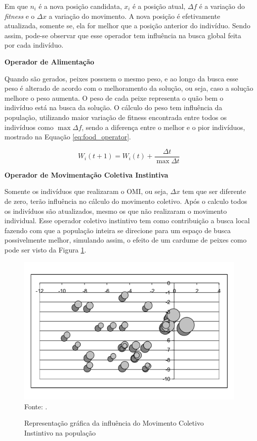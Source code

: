 \noindent Em que $n_i$ é a nova posição candidata, $x_i$ é a posição atual, $\Delta f$ é a variação do \textit{fitness} e o $\Delta x$ a variação do movimento. A nova posição é efetivamente atualizada, somente se, ela for melhor que a posição anterior do indivíduo. Sendo assim, pode-se observar que esse operador tem influência na busca global feita por cada indivíduo.

\noindent \textbf{Operador de Alimentação}

Quando são gerados, peixes possuem o mesmo peso, e ao longo da busca esse peso é alterado de acordo com o melhoramento da solução, ou seja, caso a solução melhore o peso aumenta. O peso de cada peixe representa o quão bem o indivíduo está na busca da solução. O cálculo do peso tem influência da população, utilizando maior variação de fitness encontrada entre todos os indivíduos como $\max{\Delta f}$, sendo a diferença entre o melhor e o pior indivíduos, mostrado na Equação \ref{eq:food_operator}.

\begin{equation}
\label{eq:food_operator}
W_i(t+1) = W_i(t) + \frac{\Delta t}{\max{\Delta t}}
\end{equation}

\noindent \textbf{Operador de Movimentação Coletiva Instintiva}

Somente os indivíduos que realizaram o OMI, ou seja, $\Delta x$ tem que ser diferente de zero, terão influência no cálculo do movimento coletivo. Após o calculo todos os indivíduos são atualizados, mesmo os que não realizaram o movimento individual. Esse operador coletivo instintivo tem como contribuição a busca local fazendo com que a população inteira se direcione para um espaço de busca possivelmente melhor, simulando assim, o efeito de um cardume de peixes como pode ser visto da Figura \ref{fig:coletive_moviment}.

\begin{figure}[!htb]
	\caption{Representação gráfica da influência do Movimento Coletivo Instintivo na população}
	\centering
	\includegraphics[scale=0.5]{images/movimento_coletivo.png}
	\label{fig:coletive_moviment}{\\Fonte: .}
\end{figure}

